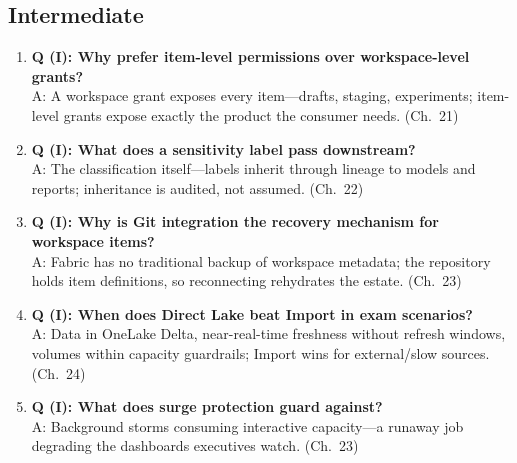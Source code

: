 \subsection*{Intermediate}
\begin{enumerate}
    \item \textbf{Q (I): Why prefer item-level permissions over workspace-level grants?}\\
    A: A workspace grant exposes every item---drafts, staging, experiments; item-level grants
    expose exactly the product the consumer needs. (Ch.~21)
    \item \textbf{Q (I): What does a sensitivity label pass downstream?}\\
    A: The classification itself---labels inherit through lineage to models and reports;
    inheritance is audited, not assumed. (Ch.~22)
    \item \textbf{Q (I): Why is Git integration the recovery mechanism for workspace items?}\\
    A: Fabric has no traditional backup of workspace metadata; the repository holds item
    definitions, so reconnecting rehydrates the estate. (Ch.~23)
    \item \textbf{Q (I): When does Direct Lake beat Import in exam scenarios?}\\
    A: Data in OneLake Delta, near-real-time freshness without refresh windows, volumes within
    capacity guardrails; Import wins for external/slow sources. (Ch.~24)
    \item \textbf{Q (I): What does surge protection guard against?}\\
    A: Background storms consuming interactive capacity---a runaway job degrading the
    dashboards executives watch. (Ch.~23)
\end{enumerate}


